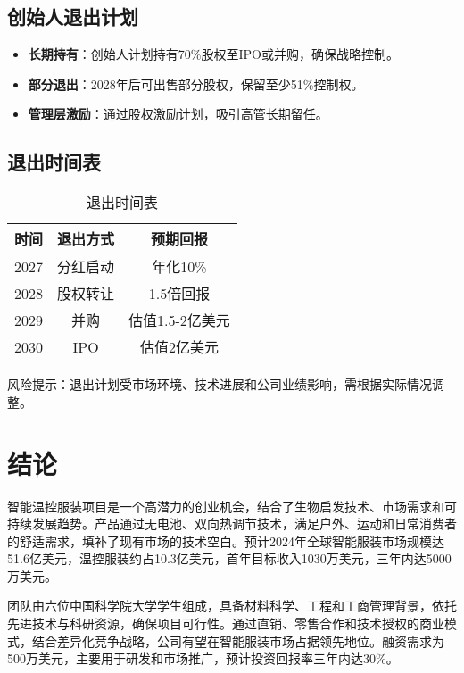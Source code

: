 \documentclass[UTF8]{report}
\theoremstyle{MyLineTheoremStyle} %
\theoremstyle{MyBlockTheoremStyle} %
\theoremstyle{MySubsubsectionStyle} %
\begin{document}
\section{创始人退出计划}
\begin{itemize}
    \item \textbf{长期持有}：创始人计划持有70\%股权至IPO或并购，确保战略控制。
    \item \textbf{部分退出}：2028年后可出售部分股权，保留至少51\%控制权。
    \item \textbf{管理层激励}：通过股权激励计划，吸引高管长期留任。
\end{itemize}

\section{退出时间表}
\begin{table}[h]
    \centering
    \begin{tabular}{|c|c|c|}
        \hline
        \textbf{时间} & \textbf{退出方式} & \textbf{预期回报} \\
        \hline
        2027 & 分红启动 & 年化10\% \\
        \hline
        2028 & 股权转让 & 1.5倍回报 \\
        \hline
        2029 & 并购 & 估值1.5-2亿美元 \\
        \hline
        2030 & IPO & 估值2亿美元 \\
        \hline
    \end{tabular}
    \caption{退出时间表}
\end{table}

风险提示：退出计划受市场环境、技术进展和公司业绩影响，需根据实际情况调整。

\chapter{结论}
智能温控服装项目是一个高潜力的创业机会，结合了生物启发技术、市场需求和可持续发展趋势。产品通过无电池、双向热调节技术，满足户外、运动和日常消费者的舒适需求，填补了现有市场的技术空白。预计2024年全球智能服装市场规模达51.6亿美元，温控服装约占10.3亿美元，首年目标收入1030万美元，三年内达5000万美元。

团队由六位中国科学院大学学生组成，具备材料科学、工程和工商管理背景，依托先进技术与科研资源，确保项目可行性。通过直销、零售合作和技术授权的商业模式，结合差异化竞争战略，公司有望在智能服装市场占据领先地位。融资需求为500万美元，主要用于研发和市场推广，预计投资回报率三年内达30\%。
\end{document}
